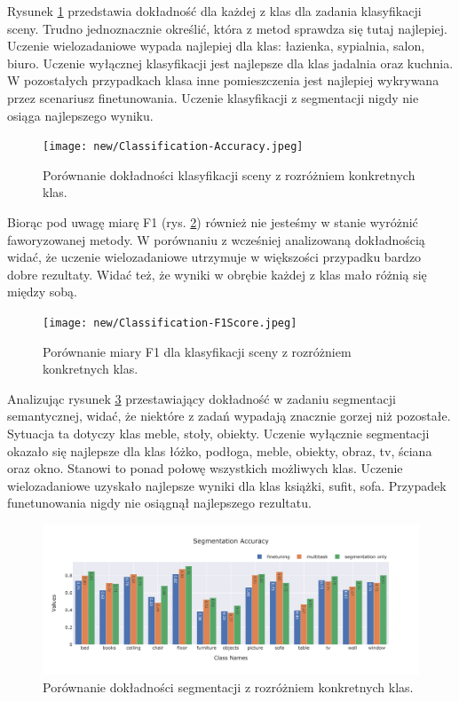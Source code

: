 \vspace{0.5cm}
Rysunek \ref{fig:classification-accuracy} przedstawia dokładność dla każdej z klas dla zadania klasyfikacji sceny. Trudno jednoznacznie określić, która z  metod sprawdza się tutaj najlepiej. Uczenie wielozadaniowe wypada najlepiej dla klas: łazienka, sypialnia, salon, biuro. Uczenie wyłącznej klasyfikacji jest najlepsze dla klas jadalnia oraz kuchnia. W pozostałych przypadkach klasa inne pomieszczenia jest najlepiej wykrywana przez scenariusz finetunowania. Uczenie klasyfikacji z segmentacji nigdy nie osiąga najlepszego wyniku.
\begin{figure}[ht!]
    \centering
    \texttt{[image: new/Classification-Accuracy.jpeg]}
    \caption{Porównanie dokładności klasyfikacji sceny z rozróżniem konkretnych klas.}
    \label{fig:classification-accuracy}
\end{figure}
Biorąc pod uwagę miarę F1 (rys. \ref{fig:classification-f1}) również nie jesteśmy w stanie wyróżnić faworyzowanej metody. W porównaniu z wcześniej analizowaną dokładnością widać, że uczenie wielozadaniowe utrzymuje w większości przypadku bardzo dobre rezultaty. Widać też, że wyniki w obrębie każdej z klas mało różnią się między sobą.
\begin{figure}[ht!]
    \centering
    \texttt{[image: new/Classification-F1Score.jpeg]}
    \caption{Porównanie miary F1 dla klasyfikacji sceny z rozróżniem konkretnych klas.}
    \label{fig:classification-f1}
\end{figure}

\vspace{0.5cm}
Analizując rysunek \ref{fig:segmentation-acc} przestawiający dokładność w zadaniu segmentacji semantycznej, widać, że niektóre z zadań wypadają znacznie gorzej niż pozostałe. Sytuacja ta dotyczy klas meble, stoły, obiekty. Uczenie wyłącznie segmentacji okazało się najlepsze dla klas łóżko, podłoga, meble, obiekty, obraz, tv, ściana oraz okno. Stanowi to ponad połowę wszystkich możliwych klas. Uczenie wielozadaniowe uzyskało najlepsze wyniki dla klas książki, sufit, sofa. Przypadek funetunowania nigdy nie osiągnął najlepszego rezultatu.
\begin{figure}[ht!]
    \centering
    \includegraphics[width=\textwidth]{result_imgs_sorted/Segmentation-Accuracy.jpeg}
    \caption{Porównanie dokładności segmentacji z rozróżniem konkretnych klas.}
    \label{fig:segmentation-acc}
\end{figure}

